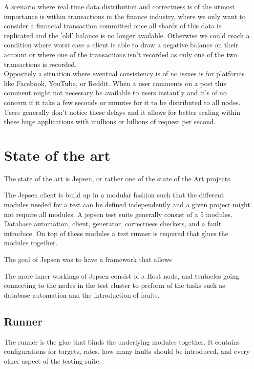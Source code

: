 \documentclass[a4paper,10pt,titlepage]{report}
\begin{document}
A scenario where real time data distribution and correctness is of the utmost importance is within transactions in the finance industry, where we only want to consider a financial transaction committed once all shards of this data is replicated and the 'old' balance is no longer available. Otherwise we could reach a condition where worst case a client is able to draw a negative balance on their account or where one of the transactions isn't recorded as only one of the two transactions is recorded.\\

Oppositely a situation where eventual consistency is of no issues is for platforms like Facebook, YouTube, or Reddit. When a user comments on a post this comment might not necessary be available to users instantly and it's of no concern if it take a few seconds or minutes for it to be distributed to all nodes. Users generally don't notice these delays and it allows for better scaling within these huge applications with mullions or billions of request per second.


\section{State of the art}

The state of the art is Jepsen, or rather one of the state of the Art projects.

The Jepsen client is build up in a modular fashion such that the different modules needed for a test can be defined independently and a given project might not require all modules. A jepsen test suite generally consist of a 5 modules. Database automation, client, generator, correctness checkers, and a fault introduce. On top of these modules a test runner is required that glues the modules together.

The goal of Jepsen was to have a framework that allows 

The more inner workings of Jepsen consist of a Host node, and tentacles going connecting to the nodes in the test cluster to preform of the tasks such as database automation and the introduction of faults.

\subsection{Runner}

The runner is the glue that binds the underlying modules together. It contains configurations for targets, rates, how many faults should be introduced, and every other aspect of the testing suite.
\end{document}
